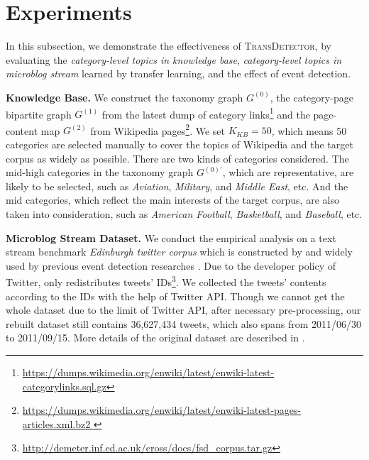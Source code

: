 \documentclass[runningheads,a4paper]{llncs}
\theoremstyle{exampstyle}
\begin{document}
\section{Experiments}
In this subsection, we demonstrate the effectiveness of \textsc{TransDetector}, by evaluating the \textit{category-level topics in knowledge base}, \textit{category-level topics in microblog stream} learned by transfer learning, and the effect of event detection. 

\textbf{Knowledge Base.} 
We construct the taxonomy graph \(G^{(0)}\), the category-page bipartite graph \(G^{(1)}\) from the latest dump of category links\footnote{\url{https://dumps.wikimedia.org/enwiki/latest/enwiki-latest-categorylinks.sql.gz}} and the page-content map \(G^{(2)}\) from Wikipedia pages\footnote{\url{https://dumps.wikimedia.org/enwiki/latest/enwiki-latest-pages-articles.xml.bz2 }}.
We set \(K_{KB}=50\), which means 50 categories are selected manually to cover the topics of Wikipedia and the target corpus as widely as possible. 
There are two kinds of categories considered. 
The mid-high categories in the taxonomy graph \(G^{(0)'}\), which are representative, are likely to be selected, such as \textit{Aviation}, \textit{Military}, and \textit{Middle East}, etc.
And the mid categories, which reflect the main interests of the target corpus, are also taken into consideration, such as \textit{American Football}, \textit{Basketball}, and \textit{Baseball}, etc. 

\textbf{Microblog Stream Dataset.} We conduct the empirical analysis on a text stream benchmark \textit{Edinburgh twitter corpus} which is constructed by \cite{petrovic2012using} and widely used by previous event detection researches \cite{petrovic2013can} \cite{Wurzer:2015wq}. 
Due to the developer policy of Twitter, \cite{petrovic2012using} only redistributes tweets' IDs\footnote{\url{http://demeter.inf.ed.ac.uk/cross/docs/fsd_corpus.tar.gz}}.
We collected the tweets' contents according to the IDs with the help of Twitter API. 
Though we cannot get the whole dataset due to the limit of Twitter API, after necessary pre-processing, our rebuilt dataset still contains 36,627,434 tweets, which also spans from 2011/06/30 to 2011/09/15.
More details of the original dataset are described in \cite{petrovic2010edinburgh}.
\end{document}

